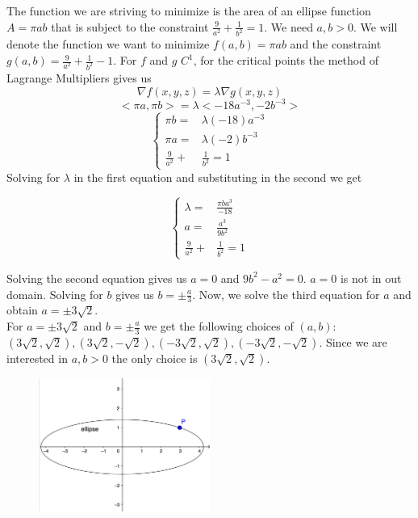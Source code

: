 \documentclass[]{article}
\begin{document}
The function we are striving to minimize is the area of an ellipse function $A=\pi ab$ that is subject to the constraint
$\frac{9}{a^2} + \frac{1}{b^2} = 1$. We need $a,b>0$. We will denote the function we want to minimize $f(a,b)=\pi ab$
and the constraint $g(a,b)=\frac{9}{a^2} + \frac{1}{b^2}-1$. For $f$ and $g$ $C^1$, for the critical points the method of Lagrange Multipliers gives us
$$    
    \nabla f(x,y,z) = \lambda \nabla g(x,y,z)
$$
$$
    <\pi a, \pi b> = \lambda <-18a^{-3}, -2b^{-3}>
$$
\begin{equation*}
    \left\{
    \begin{alignedat}{3}
        \pi b= &\lambda(-18)a^{-3} \\
        \pi a= &\lambda (-2)b^{-3} \\
        \frac{9}{a^2} +& \frac{1}{b^2} = 1
    \end{alignedat}
    \right.
\end{equation*}
Solving for $\lambda$ in the first equation and substituting in the second we get

\begin{equation*}
    \left\{
    \begin{alignedat}{3}
        \lambda= &\frac{\pi ba^{3}}{-18} \\
        a= & \frac{a^3}{9b^2} \\
        \frac{9}{a^2} +& \frac{1}{b^2} = 1
    \end{alignedat}
    \right.
\end{equation*}

Solving the second equation gives us $a=0$ and $9b^2-a^2=0$. $a=0$ is not in out domain. Solving for $b$ gives us $b=\pm \frac{a}{3}$.
Now, we solve the third equation for $a$ and obtain $a=\pm 3\sqrt{2}$.\\
For $a=\pm 3\sqrt{2}$ and $b=\pm \frac{a}{3}$ we get the following choices of $(a,b)$: $(3\sqrt{2}, \sqrt{2}), (3\sqrt{2}, -\sqrt{2}), (-3\sqrt{2}, \sqrt{2}), (-3\sqrt{2}, -\sqrt{2})$.
Since we are interested in $a,b>0$ the only choice is $(3\sqrt{2}, \sqrt{2})$. 

\begin{figure}[h]
    \centering
    \includegraphics[width=0.50\textwidth]{example2.png}
\end{figure}
\end{document}
